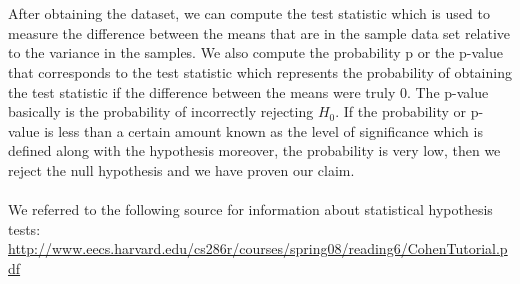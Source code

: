 \documentclass[12pt, letterpaper]{article}
\begin{document}
\\~\\
After obtaining the dataset, we can compute the test statistic which is used to measure the difference between the means that are in the sample data set relative to the variance in the samples. We also compute the probability p or the p-value that corresponds to the test statistic which represents the probability of obtaining the test statistic if the difference between the means were truly 0. The p-value basically is the probability of incorrectly rejecting $H_0$. If the probability or p-value is less than a certain amount known as the level of significance which is defined along with the hypothesis moreover, the probability is very low, then we reject the null hypothesis and we have proven our claim. 
\\~\\
We referred to the following source for information about statistical hypothesis tests: \\\url{http://www.eecs.harvard.edu/cs286r/courses/spring08/reading6/CohenTutorial.pdf}
\end{document}
